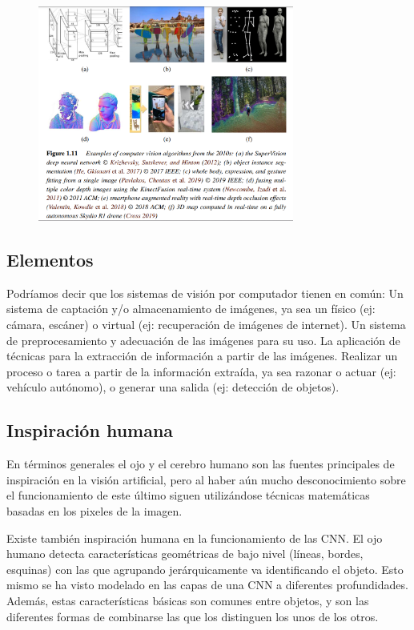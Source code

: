 \begin{figure}[H]
    \centerfloat
    \includegraphics[width=0.75\textwidth]{img/10s.png}
\end{figure}

\subsection{Elementos}

Podríamos decir que los sistemas de visión por computador tienen en común:
Un sistema de captación y/o almacenamiento de imágenes, ya sea un físico (ej: cámara, escáner) o virtual (ej: recuperación de imágenes de internet).
Un sistema de preprocesamiento y adecuación de las imágenes para su uso.
La aplicación de técnicas para la extracción de información a partir de las imágenes. 
Realizar un proceso o tarea a partir de la información extraída, ya sea razonar o actuar (ej: vehículo autónomo), o generar una salida (ej: detección de objetos).

\subsection{Inspiración humana}

En términos generales el ojo y el cerebro humano son las fuentes principales de inspiración en la visión artificial, pero al haber aún mucho desconocimiento sobre el funcionamiento de este último siguen utilizándose técnicas matemáticas basadas en los pixeles de la imagen.

\vspace{\baselineskip}

Existe también inspiración humana en la funcionamiento de las CNN. El ojo humano detecta características geométricas de bajo nivel (líneas, bordes, esquinas) con las que agrupando jerárquicamente va identificando el objeto. Esto mismo se ha visto modelado en las capas de una CNN a diferentes profundidades. Además, estas características básicas son comunes entre objetos, y son las diferentes formas de combinarse las que los distinguen los unos de los otros.